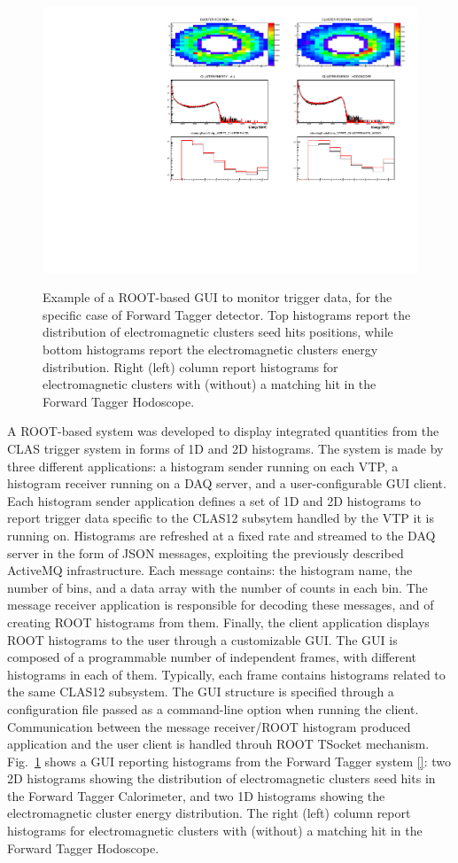 \begin{figure}[t]
  \includegraphics[width=\textwidth]{img/plotAndrea.pdf}
  \label{fig:plotAndrea}
  \caption{Example of a ROOT-based GUI to monitor trigger data, for the specific case of Forward Tagger detector. Top histograms report the distribution of electromagnetic clusters seed hits positions, while bottom histograms report the electromagnetic clusters energy distribution. Right (left) column report histograms for electromagnetic clusters  with (without) a matching hit in the Forward Tagger Hodoscope.}
\end{figure}

A ROOT-based system was developed to display integrated quantities from the CLAS trigger system in forms of 1D and 2D histograms. The system is made by three different applications: a histogram sender running on each VTP, a histogram receiver running on a DAQ server, and a user-configurable GUI client.
Each histogram sender application defines a set of 1D and 2D histograms to report trigger data specific to the CLAS12 subsytem handled by the VTP it is running on. Histograms are refreshed at a fixed rate and streamed to the DAQ server in the form of JSON messages, exploiting the previously described ActiveMQ infrastructure. Each message contains: the histogram name, the number of bins, and a data array with the number of counts in each bin.
The message receiver application is responsible for decoding these messages, and of creating ROOT histograms from them. Finally, the client application displays ROOT histograms to the user through a customizable GUI. The GUI is composed of a programmable number of independent frames, with different histograms in each of them. Typically, each frame contains histograms related to the same CLAS12 subsystem. The GUI structure is specified through a configuration file passed as a command-line option when running the client. Communication between the message receiver/ROOT histogram produced application and the user client is handled throuh ROOT TSocket mechanism.
Fig.~\ref{fig:plotAndrea} shows a GUI reporting histograms from the Forward Tagger system \ref{}: two 2D histograms showing the distribution of electromagnetic clusters seed hits in the Forward Tagger Calorimeter, and two 1D histograms showing the electromagnetic cluster energy distribution. The right (left) column report histograms for electromagnetic clusters  with (without) a matching hit in the Forward Tagger Hodoscope.

